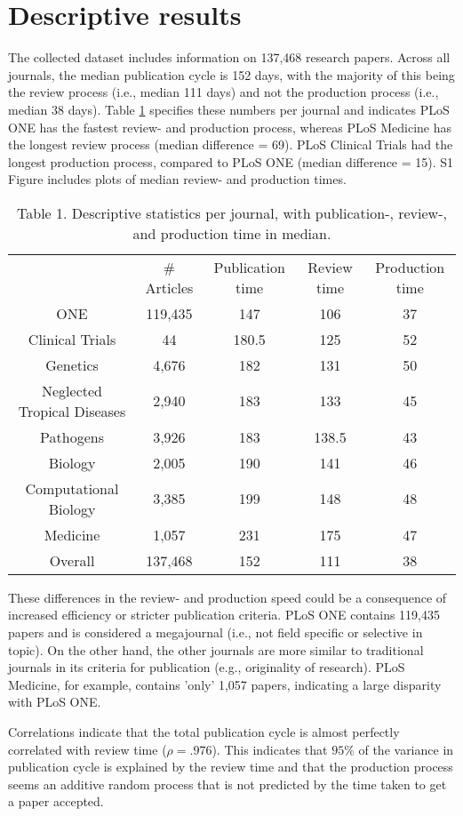 \section*{Descriptive results}
The collected dataset includes information on 137,468 research papers. Across all journals, the median publication cycle is 152 days, with the majority of this being the review process (i.e., median 111 days) and not the production process (i.e., median 38 days). Table \ref{tab:tab1} specifies these numbers per journal and indicates PLoS ONE has the fastest review- and production process, whereas PLoS Medicine has the longest review process (median difference = 69). PLoS Clinical Trials had the longest production process, compared to PLoS ONE (median difference = 15). S1 Figure includes plots of median review- and production times. 

\begin{table}
\caption{Table 1. Descriptive statistics per journal, with publication-, review-, and production time in median.}
\label{tab:tab1}
\begin{tabular}{ c c c c c }
          & \# Articles & Publication time & Review time & Production time \\
    ONE   & 119,435 & 147   & 106   & 37 \\
    Clinical Trials & 44    & 180.5 & 125   & 52 \\
    Genetics & 4,676  & 182   & 131   & 50 \\
    Neglected Tropical Diseases & 2,940  & 183   & 133   & 45 \\
    Pathogens & 3,926  & 183   & 138.5 & 43 \\
    Biology & 2,005  & 190   & 141   & 46 \\
    Computational Biology & 3,385  & 199   & 148   & 48 \\
    Medicine & 1,057  & 231   & 175   & 47 \\
    Overall & 137,468 & 152   & 111   & 38 \\
\end{tabular}
\end{table}

These differences in the review- and production speed could be a consequence of increased efficiency or stricter publication criteria. PLoS ONE contains 119,435 papers and is considered a megajournal (i.e., not field specific or selective in topic). On the other hand, the other journals are more similar to traditional journals in its criteria for publication (e.g., originality of research). PLoS Medicine, for example, contains 'only' 1,057 papers, indicating a large disparity with PLoS ONE. 

Correlations indicate that the total publication cycle is almost perfectly correlated with review time ($\rho=.976$). This indicates that $95\%$ of the variance in publication cycle is explained by the review time and that the production process seems an additive random process that is not predicted by the time taken to get a paper accepted.